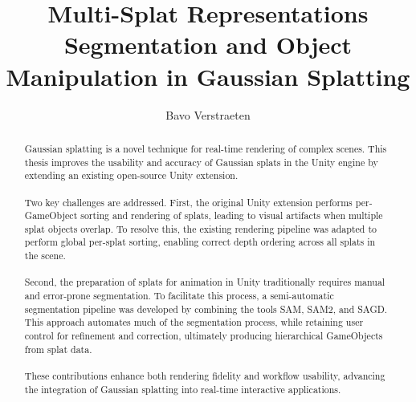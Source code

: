 \documentclass[12pt]{article}
\begin{document}
\begin{titlepage}

	\centering
	
	\title{Multi-Splat Representations \\ {\large Segmentation and Object Manipulation in Gaussian Splatting}}
	
	\author{Bavo Verstraeten}
	
	
	
	\maketitle
\end{titlepage}
	
\begin{abstract}
Gaussian splatting is a novel technique for real-time rendering of complex scenes. This thesis improves the usability and accuracy of Gaussian splats in the Unity engine by extending an existing open-source Unity extension.
\\\\
Two key challenges are addressed. First, the original Unity extension performs per-GameObject sorting and rendering of splats, leading to visual artifacts when multiple splat objects overlap. To resolve this, the existing rendering pipeline was adapted to perform global per-splat sorting, enabling correct depth ordering across all splats in the scene.
\\\\
Second, the preparation of splats for animation in Unity traditionally requires manual and error-prone segmentation. To facilitate this process, a semi-automatic segmentation pipeline was developed by combining the tools SAM, SAM2, and SAGD. This approach automates much of the segmentation process, while retaining user control for refinement and correction, ultimately producing hierarchical GameObjects from splat data.
\\\\
These contributions enhance both rendering fidelity and workflow usability, advancing the integration of Gaussian splatting into real-time interactive applications.

\end{abstract}

\begin{titlepage}
\centering
\tableofcontents
\end{titlepage}
\setcounter{page}{1}
\end{document}
